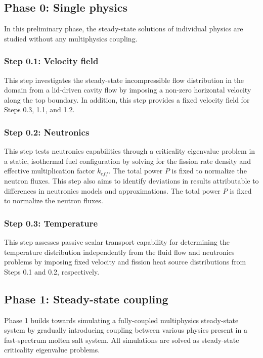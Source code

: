 \subsection{Phase 0: Single physics}

In this preliminary phase, the steady-state solutions of
individual physics are studied without any multiphysics coupling.

\subsubsection{Step 0.1: Velocity field}

This step investigates the steady-state incompressible flow distribution in the
domain from a lid-driven cavity flow by imposing a non-zero horizontal
velocity along the top boundary. In addition, this step provides a fixed
velocity field for Steps 0.3, 1.1, and 1.2.

\subsubsection{Step 0.2: Neutronics}

This step tests neutronics capabilities through a criticality eigenvalue
problem in a static, isothermal fuel configuration by solving for the fission
rate density and effective multiplication factor $k_{eff}$. The total power $P$
is fixed to normalize the neutron fluxes. This step also aims
to identify deviations in results attributable to differences in neutronics
models and approximations. The total power $P$ is fixed to normalize the
neutron fluxes.

\subsubsection{Step 0.3: Temperature}

This step assesses passive scalar transport capability for determining the
temperature distribution independently from
the fluid flow and neutronics problems by imposing fixed velocity and fission
heat source distributions from Steps 0.1 and 0.2, respectively.

\subsection{Phase 1: Steady-state coupling}

Phase 1 builds towards simulating a fully-coupled multiphysics steady-state
system by gradually introducing coupling between various physics present in
a fast-spectrum molten salt system. All simulations are solved as steady-state
criticality eigenvalue problems.

